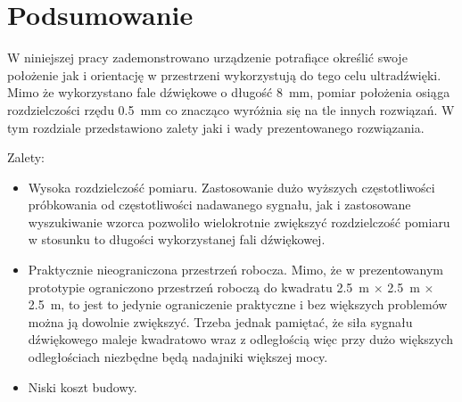 \chapter{Podsumowanie}

W niniejszej pracy zademonstrowano urządzenie potrafiące określić swoje
położenie jak i orientację w przestrzeni wykorzystują do tego celu ultradźwięki.
Mimo że wykorzystano fale dźwiękowe o długość \SI{8}{mm}, pomiar położenia osiąga rozdzielczości rzędu \SI{0,5}{mm} 
co znacząco wyróżnia się na tle innych rozwiązań.
W tym rozdziale przedstawiono zalety jaki i wady prezentowanego rozwiązania.

Zalety:
\begin{itemize}
 \item Wysoka rozdzielczość pomiaru. Zastosowanie dużo wyższych częstotliwości 
 próbkowania od częstotliwości nadawanego sygnału, jak i zastosowane wyszukiwanie wzorca pozwoliło
 wielokrotnie zwiększyć rozdzielczość pomiaru w stosunku to długości wykorzystanej fali dźwiękowej.
 
 \item Praktycznie nieograniczona przestrzeń robocza. Mimo, że w prezentowanym prototypie
 ograniczono przestrzeń roboczą do kwadratu \SI{2,5}{m} $\times$ \SI{2,5}{m} $\times$ \SI{2,5}{m},
 to jest to jedynie ograniczenie praktyczne i bez większych problemów można ją dowolnie zwiększyć. Trzeba jednak 
 pamiętać, że siła sygnału dźwiękowego maleje kwadratowo wraz z odległością więc przy dużo większych odległościach
 niezbędne będą nadajniki większej mocy. 
 
 \item Niski koszt budowy. 
\end{itemize}

